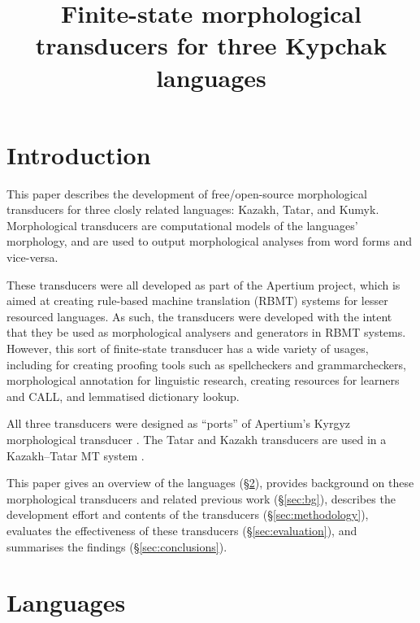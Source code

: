 \documentclass[a4paper,11pt,twocolumn]{article}
\title{Finite-state morphological transducers for three Kypchak languages}
\begin{document}
\maketitleabstract{}

\section{Introduction}

This paper describes the development of free/open-source morphological transducers for three closly related languages: Kazakh, Tatar, and Kumyk.  Morphological transducers are computational models of the languages' morphology, and are used to output morphological analyses from word forms and vice-versa.

These transducers were all developed as part of the Apertium project, which is aimed at creating rule-based machine translation (RBMT) systems for lesser resourced languages.  As such, the transducers were developed with the intent that they be used as morphological analysers and generators in RBMT systems.  However, this sort of finite-state transducer has a wide variety of usages, including for creating proofing tools such as spellcheckers and grammarcheckers, morphological annotation for linguistic research, creating resources for learners and CALL, and lemmatised dictionary lookup.


All three transducers were designed as ``ports'' of Apertium's Kyrgyz morphological transducer \citep{washington2012}.  The Tatar and Kazakh transducers are used in a Kazakh--Tatar MT system \citep{salimzyanov2013}.


This paper gives an overview of the languages (§\ref{sec:lgs}), provides background on these morphological transducers and related previous work (§\ref{sec:bg}), describes the development effort and contents of the transducers (§\ref{sec:methodology}), evaluates the effectiveness of these transducers (§\ref{sec:evaluation}), and summarises the findings (§\ref{sec:conclusions}).

\section{Languages}\label{sec:lgs}
\end{document}

